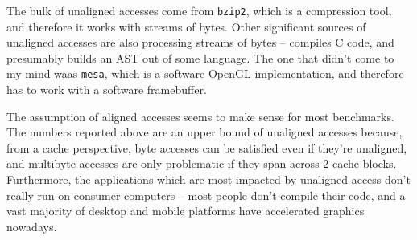 The bulk of unaligned accesses come from \texttt{bzip2}, which is a
compression tool, and therefore it works with streams of bytes. Other
significant sources of unaligned accesses are also processing streams
of bytes --  compiles C code, and  presumably builds an
AST out of some language. The one that didn't come to my mind waas
\texttt{mesa}, which is a software OpenGL implementation, and therefore has to
work with a software framebuffer.

The assumption of aligned accesses seems to make sense for most benchmarks. The
numbers reported above are an upper bound of unaligned accesses because, from a
cache perspective, byte accesses can be satisfied even if they're unaligned, and
multibyte accesses are only problematic if they span across 2 cache blocks.
Furthermore, the applications which are most impacted by unaligned access don't
really run on consumer computers -- most people don't compile their code, and a
vast majority of desktop and mobile platforms have accelerated graphics
nowadays.
